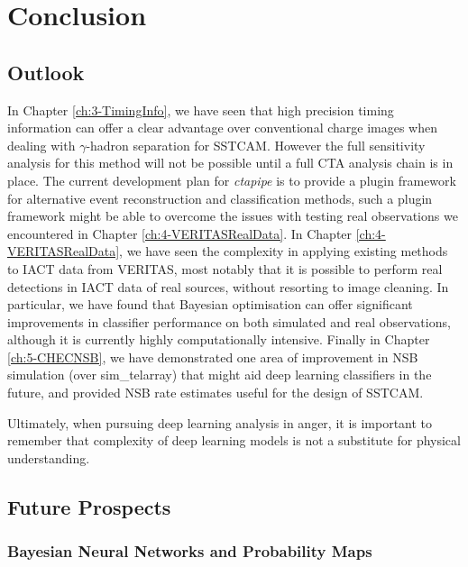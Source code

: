 \chapter{\label{ch6-Conclusions} Conclusion}
\minitoc
\section{Outlook}

In Chapter \ref{ch:3-TimingInfo}, we have seen that high precision timing information can offer a clear advantage over conventional charge images when dealing with $\gamma$-hadron separation for SSTCAM. However the full sensitivity analysis for this method will not be possible until a full CTA analysis chain is in place. The current development plan for \textit{ctapipe} is to provide a plugin framework for alternative event reconstruction and classification methods, such a plugin framework might be able to overcome the issues with testing real observations we encountered in Chapter \ref{ch:4-VERITASRealData}. In Chapter \ref{ch:4-VERITASRealData}, we have seen the complexity in applying existing methods to IACT data from VERITAS, most notably that it is possible to perform real detections in IACT data of real sources, without resorting to image cleaning. In particular, we have found that Bayesian optimisation can offer significant improvements in classifier performance on both simulated and real observations, although it is currently highly computationally intensive. Finally in Chapter \ref{ch:5-CHECNSB}, we have demonstrated one area of improvement in NSB simulation (over sim\_telarray) that might aid deep learning classifiers in the future, and provided NSB rate estimates useful for the design of SSTCAM.

Ultimately, when pursuing deep learning analysis in anger, it is important to remember that complexity of deep learning models is not a substitute for physical understanding.

\section{Future Prospects}

\subsection{Bayesian Neural Networks and Probability Maps}

